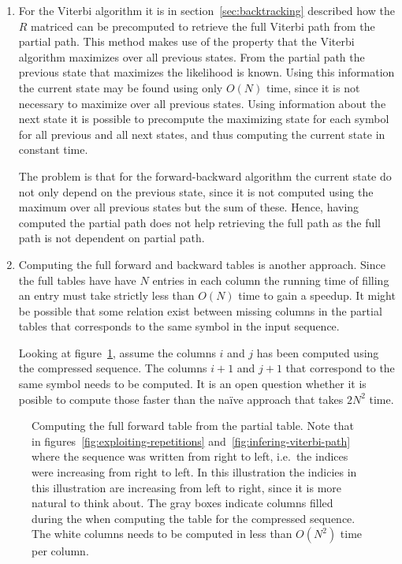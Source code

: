 \begin{enumerate}
\item For the Viterbi algorithm it is in section~\ref{sec:backtracking}
  described how the $R$ matriced can be precomputed to retrieve the full
  Viterbi path from the partial path. This method makes use of the property
  that the Viterbi algorithm maximizes over all previous states. From the
  partial path the previous state that maximizes the likelihood is known. Using
  this information the current state may be found using only $O\left(N\right)$ time, since
  it is not necessary to maximize over all previous states. Using information
  about the next state it is possible to precompute the maximizing state for
  each symbol for all previous and all next states, and thus computing the
  current state in constant time.

  The problem is that for the forward-backward algorithm the current state do
  not only depend on the previous state, since it is not computed using the
  maximum over all previous states but the sum of these. Hence, having computed
  the partial path does not help retrieving the full path as the full path is
  not dependent on partial path.
\item Computing the full forward and backward tables is another approach. Since
  the full tables have have $N$ entries in each column the running time of
  filling an entry must take strictly less than $O\left(N\right)$ time to gain a
  speedup. It might be possible that some relation exist between missing
  columns in the partial tables that corresponds to the same symbol in the
  input sequence.

  Looking at figure~\ref{fig:full-forward-table}, assume the columns $i$ and
  $j$ has been computed using the compressed sequence. The columns $i + 1$ and
  $j + 1$  that correspond to the same symbol needs to be computed. It is an
  open question whether it is posible to compute those faster than the naïve
  approach that takes $2N^2$ time.
\end{enumerate}

\begin{figure}
  \centering
  
  \caption{Computing the full forward table from the partial table. Note that
    in figures~\ref{fig:exploiting-repetitions}
    and~\ref{fig:infering-viterbi-path} where the sequence was written from
    right to left, i.e.\ the indices were increasing from right to left. In
    this illustration the indicies in this illustration are increasing from
    left to right, since it is more natural to think about. The gray boxes
    indicate columns filled during the when computing the table for the
    compressed sequence. The white columns needs to be computed in less than
    $O\left(N^2\right)$ time per column.}
  \label{fig:full-forward-table}
\end{figure}

